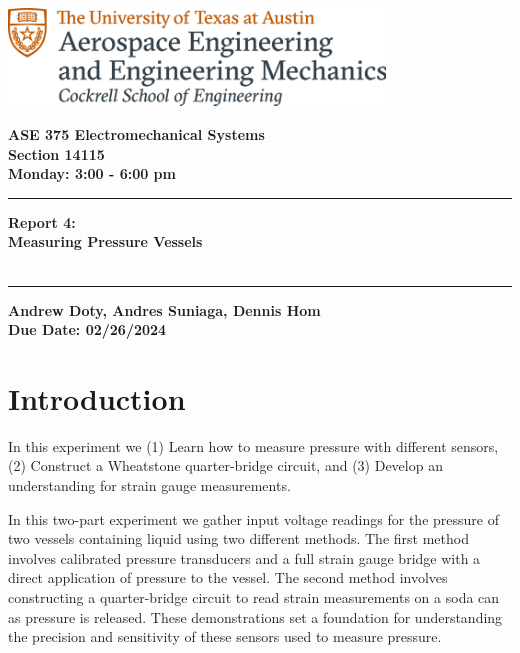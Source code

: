 \documentclass{article}
\begin{document}
\begin{titlepage}
  \centering
  \includegraphics[width=10cm]{ase-logo-formal.png}  %
  \vspace{1cm}  %
 
  \Large \textbf{ASE 375 Electromechanical Systems}\\
  \large \textbf{Section 14115}\\
  \vspace{0.5cm}
  \textbf{Monday: 3:00 - 6:00 pm}\\
 
  \vspace{1cm}
 
  \hrule
  \vspace{0.5cm}
 
  \Huge \textbf{Report 4:\\
  Measuring Pressure Vessels}\\
  \Huge \textbf{}\\
 
  \vspace{0.5cm}
  \hrule
 
  \vspace{1cm}
 
  \normalsize \textbf{Andrew Doty, Andres Suniaga, Dennis Hom}\\
  \normalsize \textbf{Due Date: 02/26/2024}
 
\end{titlepage}
\newpage

\tableofcontents
\thispagestyle{empty}
\newpage

\section{Introduction}
In this experiment we (1) Learn how to measure pressure with different sensors, (2) Construct a Wheatstone quarter-bridge circuit, and (3) Develop an understanding for strain gauge measurements. 

In this two-part experiment we gather input voltage readings for the pressure of two vessels containing liquid using two different methods. The first method involves calibrated pressure transducers and a full strain gauge bridge with a direct application of pressure to the vessel. The second method involves constructing a quarter-bridge circuit to read strain measurements on a soda can as pressure is released. These demonstrations set a foundation for understanding the precision and sensitivity of these sensors used to measure pressure. 
\end{document}
